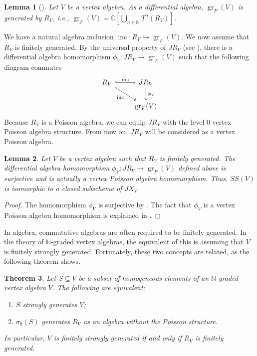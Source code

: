 \documentclass[a4paper, 12pt, reqno]{amsart}
\newtheorem{theorem}{Theorem}[section]
\newtheorem{lemma}[theorem]{Lemma}
\theoremstyle{remark}
\DeclareMathOperator{\gr}{gr}
\DeclareMathOperator{\inc}{inc}
\begin{document}
\begin{lemma}[{\cite[Lemma 4.2]{li_abelianizing_2005}}]
  \label{lmm:25}
  Let $V$ be a vertex algebra.
  As a differential algebra, $\gr_F(V)$ is generated by $R_V$, i.e., $\gr_F(V) = \mathbb{C}\left[\bigcup_{n \in \mathbb{N}}T^n(R_V)\right]$.
\end{lemma}

We have a natural algebra inclusion $\inc: R_V \hookrightarrow \gr_F(V)$.
We now assume that $R_V$ is finitely generated.
By the universal property of $JR_V$ (see ), there is a differential algebra homomorphism $\phi_V: JR_V \to \gr_F(V)$ such that the following diagram commutes
\begin{equation*}
  \begin{tikzcd}
    R_V \arrow[rd, "\inc"', hook] \arrow[r, "\inc", hook] & JR_V \arrow[d, "\phi_V"] \\
    & \gr_F(V)
  \end{tikzcd}
\end{equation*}
Because $R_V$ is a Poisson algebra, we can equip $JR_V$ with the level 0 vertex Poisson algebra structure.
From now on, $JR_V$ will be considered as a vertex Poisson algebra.

\begin{lemma}
  \label{lmm:26}
  Let $V$ be a vertex algebra such that $R_V$ is finitely generated.
  The differential algebra homomorphism $\phi_V: JR_V \to \gr_F(V)$ defined above is surjective and is actually a vertex Poisson algebra homomorphism.
  Thus, $SS(V)$ is isomorphic to a closed subscheme of $JX_V$
\end{lemma}

\begin{proof}
  The homomorphism $\phi_V$ is surjective by .
  The fact that $\phi_V$ is a vertex Poisson algebra homomorphism is explained in \cite[Proposition 2.5.1]{arakawa_remark_2012}.
\end{proof}

In algebra, commutative algebras are often required to be finitely generated.
In the theory of $\mathbb{N}$-graded vertex algebras, the equivalent of this is assuming that $V$ is finitely strongly generated.
Fortunately, these two concepts are related, as the following theorem shows.

\begin{theorem}
  \label{thr:52}
  Let $S \subseteq V$ be a subset of homogeneous elements of an $\mathbb{N}$-graded vertex algebra $V$.
  The following are equivalent:
  \begin{enumerate}
  \item $S$ strongly generates $V$;
  \item $\sigma_0(S)$ generates $R_V$ as an algebra without the Poisson structure.
  \end{enumerate}
  In particular, $V$ is finitely strongly generated if and only if $R_V$ is finitely generated.
\end{theorem}
\end{document}
